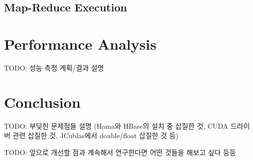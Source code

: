 \documentclass[a4paper]{article}
\begin{document}
\begin{multicols}{2}
\subsection{Map-Reduce Execution}

\section{Performance Analysis}
TODO: 성능 측정 계획/결과 설명

\section{Conclusion}
TODO: 부딪힌 문제점들 설명 (Hama와 HBase의 설치 중 삽질한 것, CUDA 드라이버 관련 삽질한 것, JCublas에서 double/float 삽질한 것 등)

TODO: 앞으로 개선할 점과 계속해서 연구한다면 어떤 것들을 해보고 싶다 등등

\end{multicols}
\end{document}
